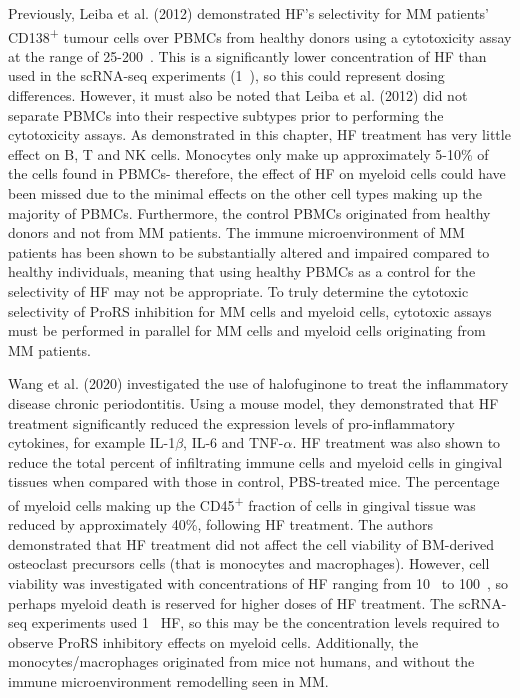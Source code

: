 Previously, Leiba et al. (2012) demonstrated HF's selectivity for MM patients' CD138\textsuperscript{+} tumour cells over PBMCs from healthy donors\cite{leiba2012halofuginone} using a cytotoxicity assay at the range of 25-200\si{\nano\Molar}.
This is a significantly lower concentration of HF than used in the scRNA-seq experiments (1\si{\micro\Molar}), so this could represent dosing differences.
However, it must also be noted that Leiba et al. (2012) did not separate PBMCs into their respective subtypes prior to performing the cytotoxicity assays.
As demonstrated in this chapter, HF treatment has very little effect on B, T and NK cells.
Monocytes only make up approximately 5-10\% of the cells found in PBMCs- therefore, the effect of HF on myeloid cells could have been missed due to the minimal effects on the other cell types making up the majority of PBMCs.
Furthermore, the control PBMCs originated from healthy donors and not from MM patients.
The immune microenvironment of MM patients has been shown to be substantially altered and impaired compared to healthy individuals\cite{de2013analysis}, meaning that using healthy PBMCs as a control for the selectivity of HF may not be appropriate.
To truly determine the cytotoxic selectivity of ProRS inhibition for MM cells and myeloid cells, cytotoxic assays must be performed in parallel for MM cells and myeloid cells originating from MM patients.

Wang et al. (2020) investigated the use of halofuginone to treat the inflammatory disease chronic periodontitis\cite{wang2020halofuginone}.
Using a mouse model, they demonstrated that HF treatment significantly reduced the expression levels of pro-inflammatory cytokines, for example IL-1$\beta$, IL-6 and TNF-$\alpha$.
HF treatment was also shown to reduce the total percent of infiltrating immune cells and myeloid cells in gingival tissues when compared with those in control, PBS-treated mice.
The percentage of myeloid cells making up the CD45\textsuperscript{+} fraction of cells in gingival tissue was reduced by approximately 40\%, following HF treatment.
The authors demonstrated that HF treatment did not affect the cell viability of BM-derived osteoclast precursors cells (that is monocytes and macrophages).
However, cell viability was investigated with concentrations of HF ranging from 10\si{\pico\Molar} to 100\si{\nano\Molar}, so perhaps myeloid death is reserved for higher doses of HF treatment.
The scRNA-seq experiments used 1\si{\micro\Molar} HF, so this may be the concentration levels required to observe ProRS inhibitory effects on myeloid cells.
Additionally, the monocytes/macrophages originated from mice not humans, and without the immune microenvironment remodelling seen in MM\@.

